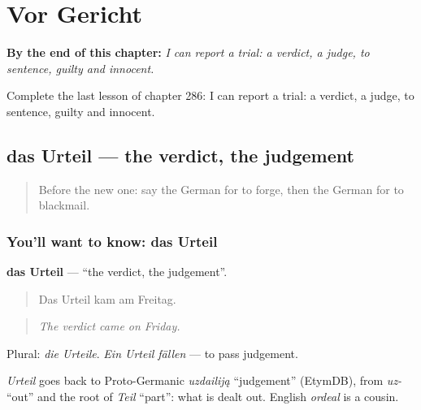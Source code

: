 
\chapter{Vor Gericht}
\label{ch:ge-vor-gericht}

\begin{chapteropening}
\textbf{By the end of this chapter:} \emph{I can report a trial: a verdict, a judge, to sentence, guilty and innocent.}

Complete the last lesson of chapter 286: I can report a trial: a verdict, a judge, to sentence, guilty and innocent.
\end{chapteropening}

\section[das Urteil]{das Urteil — the verdict, the judgement}

\label{lesson:GE-C286-urteil}



\begin{quote}
Before the new one: say the German for to forge, then the German for to blackmail.
\end{quote}

\subsection*{You'll want to know: das Urteil}
\textbf{das Urteil} — \textquotedblleft{}the verdict, the judgement\textquotedblright{}.

\begin{quote}
Das Urteil kam am Freitag.
\end{quote}

\begin{quote}
\emph{The verdict came on Friday.}
\end{quote}

Plural: \emph{die Urteile}. \emph{Ein Urteil fällen} — to pass judgement.

\begin{cousinweb}
\emph{Urteil} goes back to Proto-Germanic \emph{uzdailiją} \textquotedblleft{}judgement\textquotedblright{} (EtymDB), from \emph{uz-} \textquotedblleft{}out\textquotedblright{} and the root of \emph{Teil} \textquotedblleft{}part\textquotedblright{}: what is dealt out. English \emph{ordeal} is a cousin.
\end{cousinweb}

